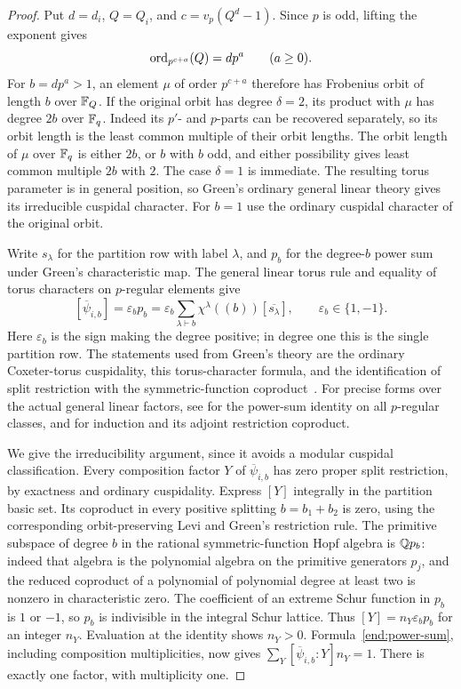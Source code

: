 \begin{proof}
Put $d=d_i$, $Q=Q_i$, and $c=v_p(Q^d-1)$.  Since $p$ is odd,
lifting the exponent gives
\[
 \operatorname{ord}_{p^{c+a}}(Q)=dp^a\qquad(a\geq0).
\]
For $b=dp^a>1$, an element $\mu$ of order $p^{c+a}$ therefore has
Frobenius orbit of length $b$ over $\mathbb F_Q$.  If the original orbit
has degree $\delta=2$, its product with $\mu$ has degree $2b$ over
$\mathbb F_q$.  Indeed its $p'$- and $p$-parts can be recovered separately,
so its orbit length is the least common multiple of their orbit
lengths.  The orbit length of $\mu$ over $\mathbb F_q$ is either $2b$, or
$b$ with $b$ odd, and either possibility gives least common multiple
$2b$ with $2$.  The case $\delta=1$ is immediate.  The resulting
torus parameter is in general position, so Green's ordinary
general linear theory gives its irreducible cuspidal character.
For $b=1$ use the ordinary cuspidal character of the original orbit.

Write $s_\lambda$ for the partition row with label $\lambda$, and
$p_b$ for the degree-$b$ power sum under Green's characteristic map.
The general linear torus rule and equality of torus characters on
$p$-regular elements give
\begin{equation}\label{end:power-sum}
 [\overline{\psi}_{i,b}]
   =\varepsilon_b p_b
   =\varepsilon_b\sum_{\lambda\vdash b}
       \chi^\lambda((b))[\overline{s_\lambda}],
 \qquad \varepsilon_b\in\{1,-1\}.
\end{equation}
Here $\varepsilon_b$ is the sign making the degree positive; in
degree one this is the single partition row.  The statements used
from Green's theory are the ordinary Coxeter-torus cuspidality,
this torus-character formula, and the identification of split
restriction with the symmetric-function coproduct~\cite{Green}.
For precise forms over the actual general linear factors, see
\cite[Property~(2.3a) and Lemma~2.3c]{BrundanDipperKleshchev}
for the power-sum identity on all $p$-regular classes, and
\cite[Equations~(2.2a), (2.3f) and Lemma~2.2d]{BrundanDipperKleshchev}
for induction and its adjoint restriction coproduct.

We give the irreducibility argument, since it avoids a modular
cuspidal classification.  Every composition factor $Y$ of
$\overline{\psi}_{i,b}$ has zero proper split restriction, by
exactness and ordinary cuspidality.  Express $[Y]$ integrally in
the partition basic set.  Its coproduct in every positive splitting
$b=b_1+b_2$ is zero, using the corresponding orbit-preserving Levi
and Green's restriction rule.  The primitive subspace of degree
$b$ in the rational symmetric-function Hopf algebra is $\mathbb Q p_b$:
indeed that algebra is the polynomial algebra on the primitive
generators $p_j$, and the reduced coproduct of a polynomial of
polynomial degree at least two is nonzero in characteristic zero.
The coefficient of an extreme Schur function in $p_b$ is $1$ or
$-1$, so $p_b$ is indivisible in the integral Schur lattice.  Thus
$[Y]=n_Y\varepsilon_b p_b$ for an integer $n_Y$.  Evaluation at the
identity shows $n_Y>0$.  Formula~\eqref{end:power-sum}, including
composition multiplicities, now gives $\sum_Y [\overline\psi_{i,b}:Y]
n_Y=1$.  There is exactly one factor, with multiplicity one.


\end{proof}
